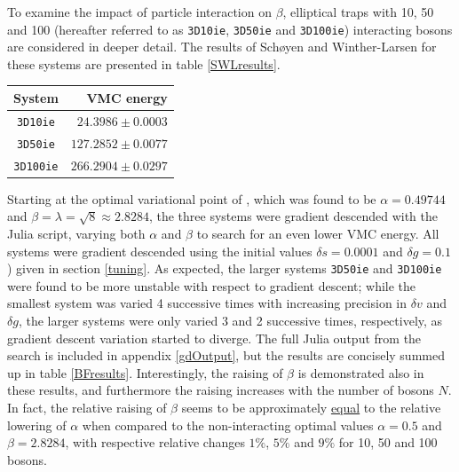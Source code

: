 \documentclass[a4paper,8pt]{article}
\begin{document}
\begin{multicols}{2}
To examine the impact of particle interaction on $\beta$, elliptical traps with 10, 50 and 100 (hereafter referred to as \texttt{3D10ie}, \texttt{3D50ie} and \texttt{3D100ie}) interacting bosons are considered in deeper detail. The results of Schøyen and Winther-Larsen for these systems are presented in table \ref{SWLresults}.

\begin{center}\small
{}
\label{SWLresults}
\begin{tabular}{cr}
	\hline\hline
	System & VMC energy \\
	\hline
    \texttt{3D10ie} & $24.3986 \pm 0.0003$\\
    \texttt{3D50ie} & $127.2852 \pm 0.0077$\\
    \texttt{3D100ie} & $266.2904 \pm 0.0297$\\
    \hline\hline
\end{tabular}
\end{center}

Starting at the optimal variational point of \cite{SWL}, which was found to be ${\alpha = 0.49744}$ and ${\beta = \lambda} = {\sqrt{8} \approx 2.8284}$, the three systems were gradient descended with the Julia script, varying both $\alpha$ and $\beta$ to search for an even lower VMC energy. All systems were gradient descended using the initial values ${\delta s = 0.0001}$ and $\delta g = 0.1$) given in section \ref{tuning}. As expected, the larger systems \texttt{3D50ie} and \texttt{3D100ie} were found to be more unstable with respect to gradient descent; while the smallest system was varied 4 successive times with increasing precision in $\delta v$ and $\delta g$, the larger systems were only varied 3 and 2 successive times, respectively, as gradient descent variation started to diverge. The full Julia output from the search is included in appendix \ref{gdOutput}, but the results are concisely summed up in table \ref{BFresults}. Interestingly, the raising of $\beta$ is demonstrated also in these results, and furthermore the raising increases with the number of bosons $N$. In fact, the relative raising of $\beta$ seems to be approximately \underline{equal} to the relative lowering of $\alpha$ when compared to the non-interacting optimal values ${\alpha = 0.5}$ and ${\beta = 2.8284}$, with respective relative changes $1\%$, $5\%$ and $9\%$ for 10, 50 and 100 bosons.


\end{multicols}
\end{document}
